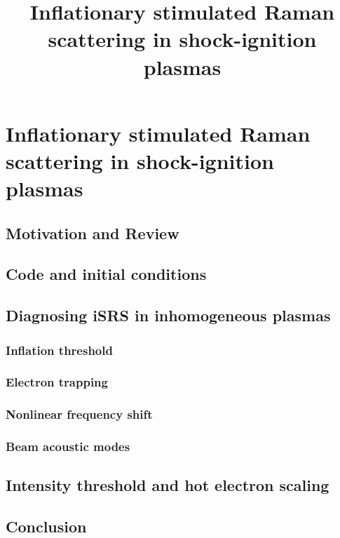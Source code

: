\chapter{Inflationary stimulated Raman scattering in shock-ignition plasmas}
\label{chp:iSRS}

\title{Inflationary stimulated Raman scattering in shock-ignition plasmas}

\section{Motivation and Review}

\section{Code and initial conditions}\label{sec:code&IC}

\section{Diagnosing iSRS in inhomogeneous plasmas}\label{sec:signatures}
\subsection{Inflation threshold}
\subsection{Electron trapping}
\subsection{Nonlinear frequency shift}
\subsection{Beam acoustic modes}

\section{Intensity threshold and hot electron scaling}\label{sec:paramScan}

\section{Conclusion}\label{sec:conclusion}





